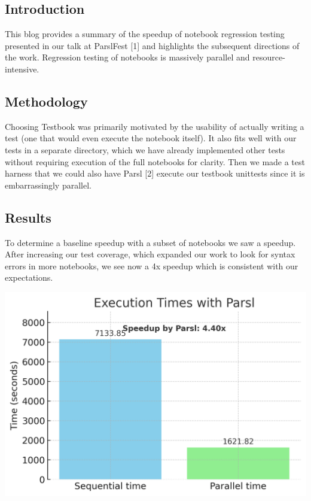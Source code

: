 \subsection{Introduction}


 This blog provides a summary of the speedup of notebook regression testing presented in our talk at ParslFest [1] %
 and highlights the subsequent directions of the work. Regression testing of notebooks is massively parallel and resource-intensive.

\subsection{Methodology}
 Choosing Testbook \cite{} was primarily motivated by the usability of actually writing a test (one that would even execute the notebook itself). It also fits well with our tests in a separate directory, which we have already implemented other tests without requiring execution of the full notebooks for clarity. Then we made a test harness that we could also have Parsl [2] execute our testbook unittests since it is embarrassingly parallel.

\subsection{Results}
To determine a baseline speedup with a subset of notebooks we saw a  speedup. 
After increasing our test coverage, which expanded our work to look for syntax errors in more notebooks, 
we see now a 4x speedup which is consistent with our expectations. 

\begin{center}
    \centering
    \includegraphics[width=.7\textwidth]{booktests/parsl_speedup_chart_no_x_lines.png}
    \label{fig:parsl_speedup}
\end{center}

